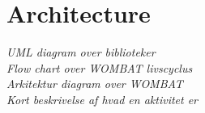 \section{Architecture}
\textit{UML diagram over biblioteker\\
Flow chart over WOMBAT livscyclus\\
Arkitektur diagram over WOMBAT\\
Kort beskrivelse af hvad en aktivitet er}